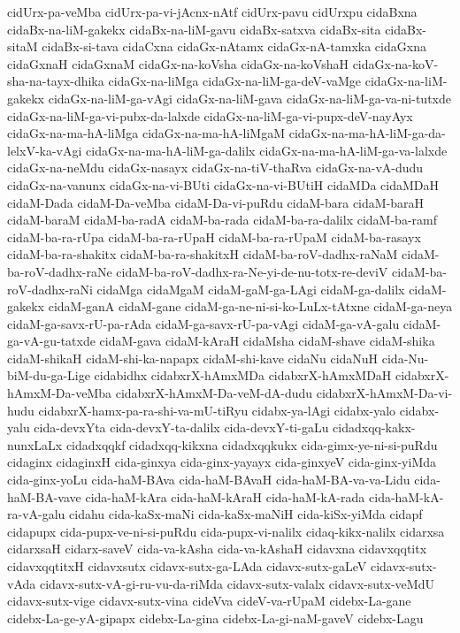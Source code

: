 {cidUrx-pa-veMba
cidUrx-pa-vi-jAcnx-nAtf
cidUrx-pavu
cidUrxpu
cidaBxna
cidaBx-na-liM-gakekx
cidaBx-na-liM-gavu
cidaBx-satxva
cidaBx-sita
cidaBx-sitaM
cidaBx-si-tava
cidaCxna
cidaGx-nAtamx
cidaGx-nA-tamxka
cidaGxna
cidaGxnaH
cidaGxnaM
cidaGx-na-koVsha
cidaGx-na-koVshaH
cidaGx-na-koV-sha-na-tayx-dhika
cidaGx-na-liMga
cidaGx-na-liM-ga-deV-vaMge
cidaGx-na-liM-gakekx
cidaGx-na-liM-ga-vAgi
cidaGx-na-liM-gava
cidaGx-na-liM-ga-va-ni-tutxde
cidaGx-na-liM-ga-vi-pubx-da-lalxde
cidaGx-na-liM-ga-vi-pupx-deV-nayAyx
cidaGx-na-ma-hA-liMga
cidaGx-na-ma-hA-liMgaM
cidaGx-na-ma-hA-liM-ga-da-lelxV-ka-vAgi
cidaGx-na-ma-hA-liM-ga-dalilx
cidaGx-na-ma-hA-liM-ga-va-lalxde
cidaGx-na-neMdu
cidaGx-nasayx
cidaGx-na-tiV-thaRva
cidaGx-na-vA-dudu
cidaGx-na-vanunx
cidaGx-na-vi-BUti
cidaGx-na-vi-BUtiH
cidaMDa
cidaMDaH
cidaM-Dada
cidaM-Da-veMba
cidaM-Da-vi-puRdu
cidaM-bara
cidaM-baraH
cidaM-baraM
cidaM-ba-radA
cidaM-ba-rada
cidaM-ba-ra-dalilx
cidaM-ba-ramf
cidaM-ba-ra-rUpa
cidaM-ba-ra-rUpaH
cidaM-ba-ra-rUpaM
cidaM-ba-rasayx
cidaM-ba-ra-shakitx
cidaM-ba-ra-shakitxH
cidaM-ba-roV-dadhx-raNaM
cidaM-ba-roV-dadhx-raNe
cidaM-ba-roV-dadhx-ra-Ne-yi-de-nu-totx-re-deviV
cidaM-ba-roV-dadhx-raNi
cidaMga
cidaMgaM
cidaM-gaM-ga-LAgi
cidaM-ga-dalilx
cidaM-gakekx
cidaM-ganA
cidaM-gane
cidaM-ga-ne-ni-si-ko-LuLx-tAtxne
cidaM-ga-neya
cidaM-ga-savx-rU-pa-rAda
cidaM-ga-savx-rU-pa-vAgi
cidaM-ga-vA-galu
cidaM-ga-vA-gu-tatxde
cidaM-gava
cidaM-kAraH
cidaMsha
cidaM-shave
cidaM-shika
cidaM-shikaH
cidaM-shi-ka-napapx
cidaM-shi-kave
cidaNu
cidaNuH
cida-Nu-biM-du-ga-Lige
cidabidhx
cidabxrX-hAmxMDa
cidabxrX-hAmxMDaH
cidabxrX-hAmxM-Da-veMba
cidabxrX-hAmxM-Da-veM-dA-dudu
cidabxrX-hAmxM-Da-vi-hudu
cidabxrX-hamx-pa-ra-shi-va-mU-tiRyu
cidabx-ya-lAgi
cidabx-yalo
cidabx-yalu
cida-devxYta
cida-devxY-ta-dalilx
cida-devxY-ti-gaLu
cidadxqq-kakx-nunxLaLx
cidadxqqkf
cidadxqq-kikxna
cidadxqqkukx
cida-gimx-ye-ni-si-puRdu
cidaginx
cidaginxH
cida-ginxya
cida-ginx-yayayx
cida-ginxyeV
cida-ginx-yiMda
cida-ginx-yoLu
cida-haM-BAva
cida-haM-BAvaH
cida-haM-BA-va-va-Lidu
cida-haM-BA-vave
cida-haM-kAra
cida-haM-kAraH
cida-haM-kA-rada
cida-haM-kA-ra-vA-galu
cidahu
cida-kaSx-maNi
cida-kaSx-maNiH
cida-kiSx-yiMda
cidapf
cidapupx
cida-pupx-ve-ni-si-puRdu
cida-pupx-vi-nalilx
cidaq-kikx-nalilx
cidarxsa
cidarxsaH
cidarx-saveV
cida-va-kAsha
cida-va-kAshaH
cidavxna
cidavxqqtitx
cidavxqqtitxH
cidavxsutx
cidavx-sutx-ga-LAda
cidavx-sutx-gaLeV
cidavx-sutx-vAda
cidavx-sutx-vA-gi-ru-vu-da-riMda
cidavx-sutx-valalx
cidavx-sutx-veMdU
cidavx-sutx-vige
cidavx-sutx-vina
cideVva
cideV-va-rUpaM
cidebx-La-gane
cidebx-La-ge-yA-gipapx
cidebx-La-gina
cidebx-La-gi-naM-gaveV
cidebx-Lagu
}
